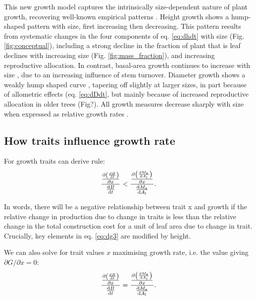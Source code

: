\documentclass[a4paper,11pt]{article}
\begin{document}
This new growth model captures the intrinsically size-dependent nature
of plant growth, recovering well-known
empirical patterns \citep{Sillett-2010, King-2011}. Height growth shows a hump-shaped pattern
with size, first increasing then decreasing. This pattern results from
systematic changes in the four components of eq. \ref{eq:dhdt} with size
(Fig. \ref{fig:conceptual}), including a strong decline in the fraction of plant
that is leaf declines with increasing size (Fig. \ref{fig:mass_fraction}),
and increasing reproductive allocation. In contrast, basal-area growth
continues to increase with size \citep{Sillett-2010, Stephenson-2014},
due to an increasing influence of stem
turnover. Diameter growth shows a weakly hump shaped
curve \citep{Herault-2011}, tapering off slightly at larger
sizes, in part because of allometric effects (eq. \ref{eq:dDdt}, but
mainly because of increased reproductive allocation in older trees
(Fig?). All growth measures decrease sharply with size when expressed as
relative growth rates \citep{Iida-2014}.


\subsection{How traits influence growth rate}

For growth traits can derive rule:
\begin{equation}\label{eq:dg4}
\frac{
\frac{\partial \left( \frac{ {\rm d}B} {{\rm d}t}\right)}{\partial x} }
{\frac{ {\rm d}B} {{\rm d}t}}
<
\frac{ \frac{\partial \left(\frac{{\rm d}M_{\rm a}} {{\rm d}A_{\rm l}}\right)
}{\partial x}}{\frac{{\rm d}M_{\rm a}} {{\rm d}A_{\rm l}}}.
\end{equation}

In words, there will be a negative relationship between trait x and growth if the
relative change in production due to change in traits is less than the relative change
in the total construction cost for a unit of leaf area due to change in trait. Crucially,
key elements in eq. \ref{eq:dg3} are modified by height.

We can also solve for trait values $x$ maximising growth rate, i.e. the value
giving $\partial G /\partial x = 0$:
\begin{equation}\label{eq:max}
\frac{
\frac{\partial \left( \frac{ {\rm d}B} {{\rm d}t}\right)}{\partial x} }
{\frac{ {\rm d}B} {{\rm d}t}}
=
\frac{ \frac{\partial \left(\frac{{\rm d}M_{\rm a}} {{\rm d}A_{\rm l}}\right)
}{\partial x}}{\frac{{\rm d}M_{\rm a}} {{\rm d}A_{\rm l}}}.
\end{equation}
\end{document}
